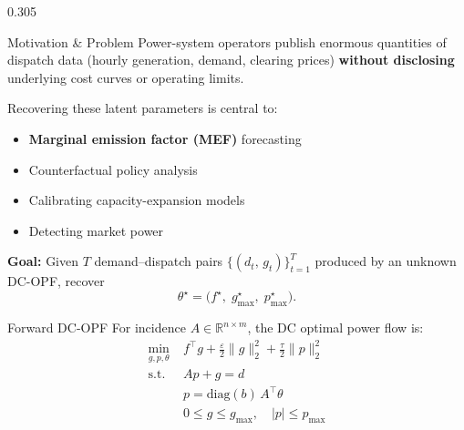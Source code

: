 \documentclass[final]{beamer}
\newcommand{\R}{\mathbb{R}}
\newcommand{\opt}{^{\star}}
\begin{document}
\begin{frame}[t]{}

\vskip0.3cm
\begin{columns}[t, totalwidth=\textwidth]

\begin{column}{0.305\textwidth}

  \begin{block}{Motivation \& Problem}
    Power-system operators publish enormous quantities of dispatch data
    (hourly generation, demand, clearing prices) \textbf{without disclosing}
    underlying cost curves or operating limits.
    \medskip

    Recovering these latent parameters is central to:
    \begin{itemize}
      \item \textbf{Marginal emission factor (MEF)} forecasting
      \item Counterfactual policy analysis
      \item Calibrating capacity-expansion models
      \item Detecting market power
    \end{itemize}

    \medskip
    \begin{tcolorbox}[colback=StanfordLightSand, colframe=StanfordCardinal,
                      boxrule=1.5pt, arc=4pt, left=4pt, right=4pt]
      \textbf{Goal:} Given $T$ demand--dispatch pairs
      $\{(d_t,\, g_t)\}_{t=1}^T$ produced by an unknown DC-OPF, recover
      \[
        \theta\opt = \bigl(f\opt,\; g_{\max}\opt,\; p_{\max}\opt\bigr).
      \]
    \end{tcolorbox}
  \end{block}

  \begin{block}{Forward DC-OPF}
    For incidence $A\in\R^{n\times m}$, the DC optimal power flow is:
    \[
    \begin{aligned}
      \min_{g,p,\theta}\;&
        f^\top g + \tfrac{\varepsilon}{2}\|g\|_2^2 + \tfrac{\tau}{2}\|p\|_2^2\\
      \text{s.t.}\;& Ap + g = d \\
      & p = \mathrm{diag}(b)\,A^\top\theta \\
      & 0 \le g \le g_{\max},\quad |p|\le p_{\max}
    \end{aligned}
    \]


\end{block}
\end{column}
\end{columns}
\end{frame}
\end{document}
